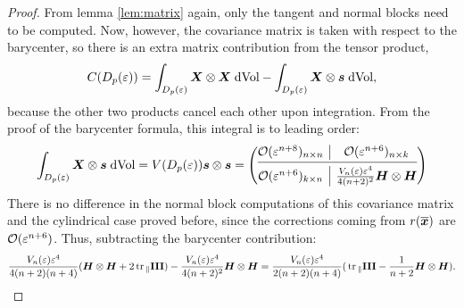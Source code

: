 \documentclass[letterpaper, reqno, 11pt]{amsart}
\theoremstyle{definition}
\theoremstyle{remark}
\numberwithin{equation}{section}
\begin{document}
\begin{proof}
From lemma \ref{lem:matrix} again, only the tangent and normal blocks need to be computed. Now, however, the covariance matrix is taken with respect to the barycenter, so there is an extra matrix contribution from the tensor product,
$$
C(D_p(\varepsilon)) =\int_{D_p(\varepsilon)} \boldsymbol{X}\otimes\boldsymbol{X}\;\text{dVol} - \int_{D_p(\varepsilon)} \boldsymbol{X}\otimes\boldsymbol{s}\;\text{dVol},
$$
because the other two products cancel each other upon integration. From the proof of the barycenter formula, this integral is to leading order:
\begin{align*}
	\int_{D_p(\vep)} \bs{X}\otimes\bb\;\text{dVol} = V(D_p(\vep))\bb \otimes\bb = 
\left( \begin{array}{@{}c|c@{}}
	  \cO(\vep^{n+8})_{n\times n}
      & \cO(\vep^{n+6})_{n\times k} \\
   \cmidrule[0.4pt]{1-2}
   \cO(\vep^{n+6})_{k\times n} & \frac{V_n(\vep)\vep^4}{4(n+2)^2}\bH\otimes\bH \\
\end{array} \right)
\end{align*}
There is no difference in the normal block computations of this covariance matrix and the cylindrical case proved before, since the corrections coming from $r(\boldsymbol{\overline{x}})$ are ${\mathcal O}(\varepsilon^{n+6})$. Thus, subtracting the barycenter contribution:
$$
\frac{V_n(\varepsilon)\varepsilon^4}{4(n+2)(n+4)}(\boldsymbol{H}\otimes\boldsymbol{H} + 2\,\mathrm{tr}\,_\parallel\boldsymbol{\mathrm{III}} ) - \frac{V_n(\varepsilon)\varepsilon^4}{4(n+2)^2}\boldsymbol{H}\otimes\boldsymbol{H} = \frac{V_n(\varepsilon)\varepsilon^4}{2(n+2)(n+4)} (\,\mathrm{tr}\,_\parallel\boldsymbol{\mathrm{III}} -\frac{1}{n+2}\boldsymbol{H}\otimes\boldsymbol{H} ).
$$


\end{proof}
\end{document}

